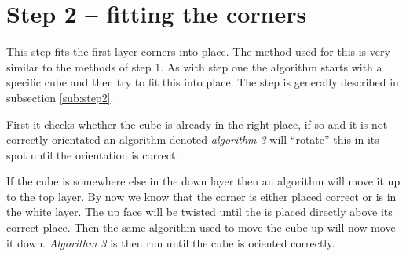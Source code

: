 \section{Step 2 -- fitting the corners}
This step fits the first layer corners into place. The method used for this is very similar to the methods of step 1. 
As with step one the algorithm starts with a specific cube and then try to fit this into place. 
The step is generally described in subsection \ref{sub:step2}.

First it checks whether the cube is already in the right place, if so and it is not correctly orientated an algorithm denoted \textit{algorithm 3} will ``rotate'' this \cpiece{} in its spot until the orientation is correct. 

If the cube is somewhere else in the down layer then an algorithm will move it up to the top layer. 
By now we know that the corner \cpiece{} is either placed correct or is in the white layer. 
The up face will be twisted until the \cpiece{} is placed directly above its correct place. 
Then the same algorithm used to move the cube up will now move it down. 
\textit{Algorithm 3} is then run until the cube is oriented correctly.

